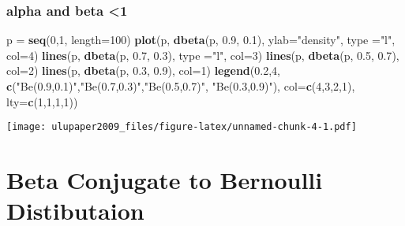 \documentclass[
]{book}
\newenvironment{Shaded}{\begin{snugshade}}{\end{snugshade}}
\newcommand{\DataTypeTok}[1]{\textcolor[rgb]{0.13,0.29,0.53}{#1}}
\newcommand{\DecValTok}[1]{\textcolor[rgb]{0.00,0.00,0.81}{#1}}
\newcommand{\FloatTok}[1]{\textcolor[rgb]{0.00,0.00,0.81}{#1}}
\newcommand{\KeywordTok}[1]{\textcolor[rgb]{0.13,0.29,0.53}{\textbf{#1}}}
\newcommand{\NormalTok}[1]{#1}
\newcommand{\StringTok}[1]{\textcolor[rgb]{0.31,0.60,0.02}{#1}}
\begin{document}
\hypertarget{alpha-and-beta-1}{%
\subsubsection{alpha and beta \textless1}\label{alpha-and-beta-1}}

\begin{Shaded}
\begin{Highlighting}[]
\NormalTok{p =}\StringTok{ }\KeywordTok{seq}\NormalTok{(}\DecValTok{0}\NormalTok{,}\DecValTok{1}\NormalTok{, }\DataTypeTok{length=}\DecValTok{100}\NormalTok{)}
\KeywordTok{plot}\NormalTok{(p, }\KeywordTok{dbeta}\NormalTok{(p, }\FloatTok{0.9}\NormalTok{, }\FloatTok{0.1}\NormalTok{), }\DataTypeTok{ylab=}\StringTok{"density"}\NormalTok{, }\DataTypeTok{type =}\StringTok{"l"}\NormalTok{, }\DataTypeTok{col=}\DecValTok{4}\NormalTok{)}
\KeywordTok{lines}\NormalTok{(p, }\KeywordTok{dbeta}\NormalTok{(p, }\FloatTok{0.7}\NormalTok{, }\FloatTok{0.3}\NormalTok{), }\DataTypeTok{type =}\StringTok{"l"}\NormalTok{, }\DataTypeTok{col=}\DecValTok{3}\NormalTok{)}
\KeywordTok{lines}\NormalTok{(p, }\KeywordTok{dbeta}\NormalTok{(p, }\FloatTok{0.5}\NormalTok{, }\FloatTok{0.7}\NormalTok{), }\DataTypeTok{col=}\DecValTok{2}\NormalTok{) }
\KeywordTok{lines}\NormalTok{(p, }\KeywordTok{dbeta}\NormalTok{(p, }\FloatTok{0.3}\NormalTok{, }\FloatTok{0.9}\NormalTok{), }\DataTypeTok{col=}\DecValTok{1}\NormalTok{) }
\KeywordTok{legend}\NormalTok{(}\FloatTok{0.2}\NormalTok{,}\DecValTok{4}\NormalTok{, }\KeywordTok{c}\NormalTok{(}\StringTok{"Be(0.9,0.1)"}\NormalTok{,}\StringTok{"Be(0.7,0.3)"}\NormalTok{,}\StringTok{"Be(0.5,0.7)"}\NormalTok{, }\StringTok{"Be(0.3,0.9)"}\NormalTok{), }\DataTypeTok{col=}\KeywordTok{c}\NormalTok{(}\DecValTok{4}\NormalTok{,}\DecValTok{3}\NormalTok{,}\DecValTok{2}\NormalTok{,}\DecValTok{1}\NormalTok{), }\DataTypeTok{lty=}\KeywordTok{c}\NormalTok{(}\DecValTok{1}\NormalTok{,}\DecValTok{1}\NormalTok{,}\DecValTok{1}\NormalTok{,}\DecValTok{1}\NormalTok{))}
\end{Highlighting}
\end{Shaded}

\texttt{[image: ulupaper2009\_files/figure-latex/unnamed-chunk-4-1.pdf]}

\hypertarget{beta-conjugate-to-bernoulli-distibutaion}{%
\section{Beta Conjugate to Bernoulli Distibutaion}\label{beta-conjugate-to-bernoulli-distibutaion}}
\end{document}
